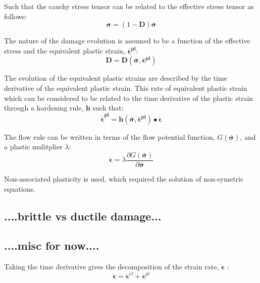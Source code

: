 Such that the cauchy stress tensor can be related to the effective
stress tensor as follows: 
\begin{equation}
\boldsymbol{\sigma}=(1-\mathbf{D})\boldsymbol{\bar{\sigma}}\label{eqn:const7}
\end{equation}


The nature of the damage evolution is assumed to be a function of
the effective stress and the equivalent plastic strain, $\boldsymbol{\bar{\epsilon}^{pl}}$:
\begin{equation}
\mathbf{D}=\mathbf{D}(\boldsymbol{\bar{\sigma}},\boldsymbol{\bar{\epsilon}^{pl}})\label{eqn:const8}
\end{equation}


The evolution of the equivalent plastic strains are described by the
time derivative of the equivalent plastic strain. This rate of equivalent
plastic strain which can be considered to be related to the time derivative
of the plastic strain through a hardening rule, $\mathbf{h}$ such
that: 
\begin{equation}
\boldsymbol{\dot{\bar{\epsilon}}^{pl}}=\mathbf{h}(\boldsymbol{\bar{\sigma}},\boldsymbol{\bar{\epsilon}^{pl}})\bullet\boldsymbol{\dot{\epsilon}}\label{eqn:const10}
\end{equation}


The flow rule can be written in terms of the flow potential function,
$G(\boldsymbol{\bar{\sigma}})$, and a plastic mulitplier $\dot{\lambda}$:
\begin{equation}
\boldsymbol{\dot{\epsilon}}=\dot{\lambda}\dfrac{\partial G(\boldsymbol{\bar{\sigma}})}{\partial\boldsymbol{\bar{\sigma}}}\label{eqn:const11}
\end{equation}


Non-associated plasticity is used, which required the solution of
non-symetric equations.


\subsection{....brittle vs ductile damage...}


\subsection{....misc for now....}

Taking the time derivative gives the decomposition of the strain rate,
$\boldsymbol{\dot{\epsilon}}$ : 
\begin{equation}
\boldsymbol{\dot{\epsilon}}=\boldsymbol{\dot{\epsilon}}^{el}+\boldsymbol{\dot{\epsilon}}^{pl}\label{eqn:const2}
\end{equation}

